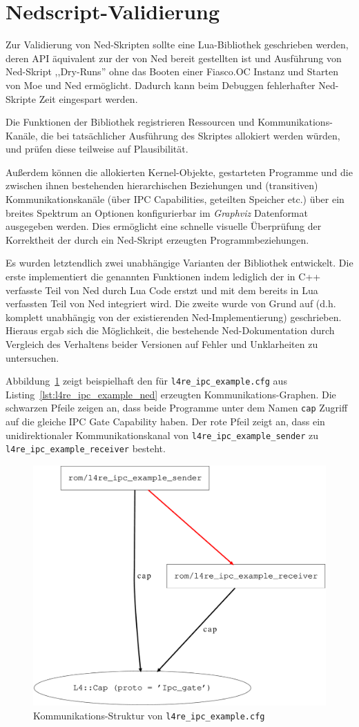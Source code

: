 \section{Nedscript-Validierung}

Zur Validierung von Ned-Skripten sollte eine Lua-Bibliothek
geschrieben werden, deren API äquivalent zur der von Ned bereit gestellten ist
und Ausführung von Ned-Skript ,,Dry-Runs'' ohne das Booten einer Fiasco.OC
Instanz und Starten von Moe und Ned ermöglicht.
Dadurch kann beim Debuggen fehlerhafter Ned-Skripte Zeit eingespart werden.

Die Funktionen der Bibliothek registrieren Ressourcen und Kommunikations-Kanäle,
die bei tatsächlicher Ausführung des Skriptes allokiert werden würden, und
prüfen diese teilweise auf Plausibilität.

Außerdem können die allokierten Kernel-Objekte, gestarteten Programme und die
zwischen ihnen bestehenden hierarchischen Beziehungen und (transitiven)
Kommunikationskanäle (über IPC Capabilities, geteilten Speicher etc.) über ein
breites Spektrum an Optionen konfigurierbar im \textit{Graphviz} Datenformat
ausgegeben werden. Dies ermöglicht eine schnelle visuelle Überprüfung der
Korrektheit der durch ein Ned-Skript erzeugten Programmbeziehungen.

Es wurden letztendlich zwei unabhängige Varianten der Bibliothek entwickelt.
Die erste implementiert die genannten Funktionen indem lediglich der in C++
verfasste Teil von Ned durch Lua Code erstzt und mit dem bereits in Lua
verfassten Teil von Ned integriert wird. Die zweite wurde von Grund auf (d.h.
komplett unabhängig von der existierenden Ned-Implementierung) geschrieben.
Hieraus ergab sich die Möglichkeit, die bestehende Ned-Dokumentation durch
Vergleich des Verhaltens beider Versionen auf Fehler und Unklarheiten zu
untersuchen.

Abbildung~\ref{fig:nedmock} zeigt beispielhaft den für
\texttt{l4re\_ipc\_example.cfg} aus Listing~\ref{lst:l4re_ipc_example_ned}
erzeugten Kommunikations-Graphen. Die schwarzen Pfeile zeigen an, dass beide
Programme unter dem Namen \texttt{cap} Zugriff auf die gleiche IPC Gate
Capability haben.  Der rote Pfeil zeigt an, dass ein unidirektionaler
Kommunikationskanal von \texttt{l4re\_ipc\_example\_sender} zu
\texttt{l4re\_ipc\_example\_receiver} besteht.

\begin{figure}
  \centering
  \includegraphics{../resources/nedmock.png}
  \caption{Kommunikations-Struktur von \texttt{l4re\_ipc\_example.cfg}}
  \label{fig:nedmock}
\end{figure}
